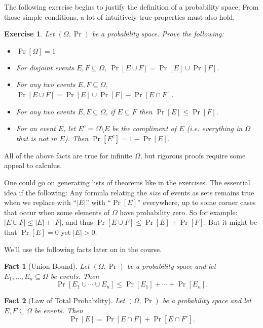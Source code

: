 \documentclass[11pt]{article}
\newtheorem{fact}{Fact}
\newtheorem{exercise}{Exercise}
\begin{document}
The following exercise begins to justify the definition of a probability
space; From those simple conditions, a lot of intuitively-true properties
must also hold.
\begin{exercise}
    Let $(\Omega,\Pr)$ be a probability space.
    Prove the following: 
    \begin{itemize}
        \item $\Pr[\Omega] = 1$
        \item For disjoint events $E,F\subseteq \Omega$, 
            $\Pr[E\cup F] = \Pr[E] \cup \Pr[F]$.
        \item For any two events $E,F\subseteq \Omega$, 
            $\Pr[E\cup F] = \Pr[E] \cup \Pr[F] - \Pr[E\cap F]$.
        \item For any two events $E,F\subseteq \Omega$, if $E\subseteq F$
            then $\Pr[E] \leq \Pr[F]$.
        \item For an event $E$, let $E^c = \Omega \setminus E$ be the
            compliment of $E$ (i.e. everything in $\Omega$ that is not in
            $E$). Then $\Pr[E^c] = 1 - \Pr[E]$.
    \end{itemize}
\end{exercise}
All of the above facts are true for infinite $\Omega$, but rigorous proofs
require some appeal to calculus.

One could go on generating lists of theorems like in the exercises. The
essential idea if the following: Any formula relating the \emph{size} of
events as sets remains true when we replace with ``$|E|$'' with ``$\Pr[E]$''
everywhere, up to some corner cases that occur when some elements of $\Omega$ have
probability zero. So for example: $|E\cup F| \leq |E| + |F|$, and
thus $\Pr[E\cup F] \leq \Pr[E] + \Pr[F]$. But it might be that $\Pr[E]=0$
yet $|E| > 0$. 

We'll use the following facts later on in the course.

\begin{fact}[Union Bound]
    Let $(\Omega,\Pr)$ be a probability space 
    and let $E_1,\ldots,E_n\subseteq \Omega$ be events. Then
    \[
        \Pr[E_1 \cup \cdots \cup E_n] \leq
        \Pr[E_1] + \cdots + \Pr[E_n].
    \]
\end{fact}

\begin{fact}[Law of Total Probability]
    Let $(\Omega,\Pr)$ be a probability space 
    and let $E,F\subseteq \Omega$ be events. Then
    \[
        \Pr[E] = \Pr[E\cap F] + \Pr[E \cap F^c].
    \]
\end{fact}
\end{document}
